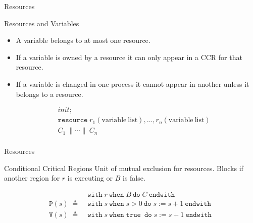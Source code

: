 \documentclass{beamer}
\newcommand{\mtt}[1]{
  \mathtt{#1}\;
}
\begin{document}
\begin{frame}{Resources}
  \begin{block}{Resources and Variables}
    \begin{itemize}
    \item{
        A variable belongs to at most one resource.
    }

    \item{
        If a variable is owned by a resource it can only appear in a CCR for that resource.
    }

    \item{
        If a variable is changed in one process it cannot appear in another unless it belongs to a resource.
    }
    \end{itemize}
  \end{block}
  \begin{example}
    \begin{align*}
      & init;\\
      & \mtt{resource} r_1\mathrm{(variable\ list)},\ldots,r_n\mathrm{(variable\ list)} \\
      & \mathit{C_1}\ \| \cdots \|\ \mathit{C_n}\\
    \end{align*}
  \end{example}

\end{frame}


\begin{frame}{Resources}
  \begin{block}{Conditional Critical Regions}
    Unit of mutual exclusion for resources. Blocks if another region for $r$ is executing or $B$ is false.
  \end{block}

  \begin{example}
    \begin{align*}
      \; &\mtt{with} r\ \mtt{when} B\ \mtt{do} C\ \mtt{endwith}\\
      \mathtt{P}(s)\; \triangleq\; &\mtt{with} s\ \mtt{when} s > 0\ \mtt{do} s := s + 1\ \mtt{endwith}\\
      \mathtt{V}(s)\; \triangleq\; &\mtt{with} s\ \mtt{when} \mtt{true}\ \mtt{do} s := s + 1\ \mtt{endwith}\\
    \end{align*}
  \end{example}
\end{frame}
\end{document}
